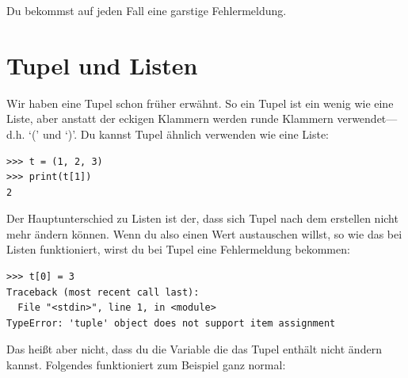 \noindent
Du bekommst auf jeden Fall eine garstige Fehlermeldung.

\section{Tupel und Listen}\label{tuplesandlists}

Wir haben eine Tupel schon früher erwähnt. So ein Tupel ist ein wenig wie eine Liste, aber anstatt der eckigen Klammern werden runde Klammern verwendet---d.h. `(' und `)'. Du kannst Tupel ähnlich verwenden wie eine Liste:

\begin{Verbatim}[frame=single]
>>> t = (1, 2, 3)
>>> print(t[1])
2
\end{Verbatim}

Der Hauptunterschied zu Listen ist der, dass sich Tupel nach dem erstellen nicht mehr ändern können. Wenn du also einen Wert austauschen willst, so wie das bei Listen funktioniert, wirst du bei Tupel eine Fehlermeldung bekommen:

\begin{Verbatim}[frame=single]
>>> t[0] = 3
Traceback (most recent call last):
  File "<stdin>", line 1, in <module>
TypeError: 'tuple' object does not support item assignment
\end{Verbatim}

Das heißt aber nicht, dass du die Variable die das Tupel enthält nicht ändern kannst. Folgendes funktioniert zum Beispiel ganz normal:

